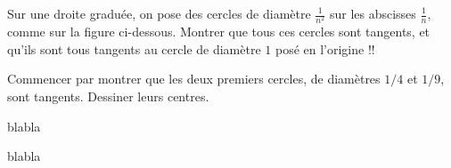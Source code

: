 \begin{exo}
Sur une droite graduée, on \og pose\fg{} des cercles de diamètre $\frac{1}{n^2}$ sur les abscisses $\frac{1}{n}$, comme sur la figure ci-dessous. Montrer que tous ces cercles sont tangents, et qu'ils sont tous tangents au cercle de diamètre $1$ posé en l'origine !!
\begin{center}
\end{center}
\begin{hint}
Commencer par montrer que les deux premiers cercles, de diamètres $1/4$ et $1/9$, sont tangents. Dessiner leurs centres.
\end{hint}
\end{exo}

\begin{exo}
blabla
\begin{center}
\begin{tikzpicture}
\end{tikzpicture}
\end{center}
\end{exo}


\begin{exo}
blabla
\begin{center}
\begin{tikzpicture}
\end{tikzpicture}
\end{center}
\end{exo}




